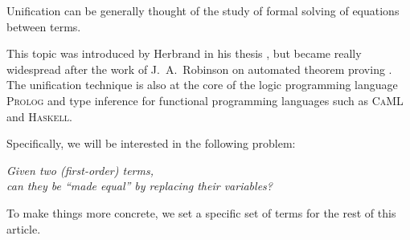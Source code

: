 Unification can be generally thought of the study of formal solving of equations between terms.

This topic was introduced by Herbrand in his thesis \cite{herbrand_recherches_1930}, but became really widespread after the work of J.~A.~Robinson on automated theorem proving \cite{robinson_machine-oriented_1965}.
The unification technique is also at the core of the logic programming language \textsc{Prolog} and type inference for functional programming languages such as \textsc{CaML} and \textsc{Haskell}.


Specifically, we will be interested in the following problem: 
\begin{center}
	\it Given two (first-order) terms,\\ can they be “made equal” by replacing their variables?
\end{center}

To make things more concrete, we set a specific set of terms for the rest of this article.





